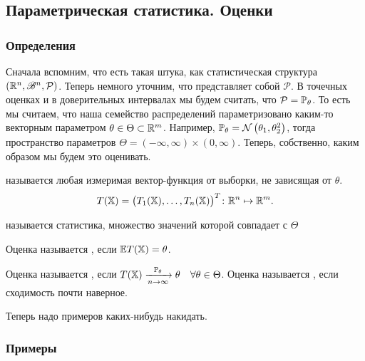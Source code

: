\documentclass[../TV&MS.tex]{subfiles}
\begin{document}
    
\subsection{Параметрическая статистика. Оценки}

\subsubsection{Определения}

Сначала вспомним, что есть такая штука, как статистическая структура
$\left( \mathbb{R}^{n}, \mathscr{B}^{n}, \mathcal{P} \right)$.
Теперь немного уточним, что представляет собой $\mathcal{P}$.
В точечных оценках и в доверительных интервалах мы будем считать,
что $\mathcal{P} = \mathbb{P}_\theta$.
То есть мы считаем, что наша семейство распределений параметризовано каким-то векторным параметром $\theta \in \Theta \subset \mathbb{R}^{m}$.
Например, $\mathbb{P}_\theta = \mathcal{N}\left( \theta_1, \theta_2^2 \right)$,
тогда пространство параметров $\Theta = (-\infty, \infty) \times (0, \infty)$.
Теперь, собственно, каким образом мы будем это оценивать.

\begin{Def}\label{ms:e:def:stat}
     называется любая измеримая вектор-функция от выборки, не зависящая от $\theta$.
    \[
        T(\mathbb{X}) = \bigl( T_1(\mathbb{X}),\ldots, T_n(\mathbb{X}) \bigr)^{T} \colon \mathbb{R}^{n} \mapsto \mathbb{R}^{m}
    .\] 
\end{Def} 

\begin{Def}\label{ms:e:def:estimate}
     называется статистика, множество значений которой совпадает с $\Theta$
\end{Def} 

\begin{Def}\label{ms:e:def:unbiased}
    Оценка называется , если $\mathbb{E} T(\mathbb{X}) = \theta$.
\end{Def} 

\begin{Def}\label{ms:e:def:consistent}
    Оценка называется , если $T(\mathbb{X}) \xrightarrow[n\rightarrow \infty]{\mathbb{P}_\theta} \theta \quad \forall \theta \in \Theta$.
    Оценка называется , если сходимость почти наверное.
\end{Def} 

Теперь надо примеров каких-нибудь накидать.

\subsubsection{Примеры}
\end{document}
